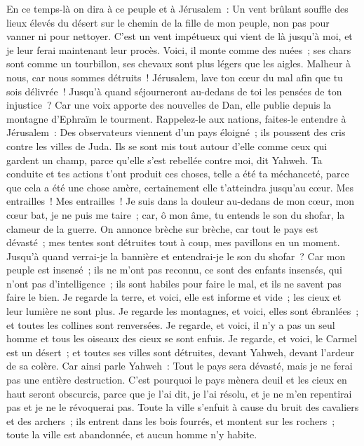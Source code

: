 \begin{multicols}{2}
En ce temps-là on dira à ce peuple et à Jérusalem~: Un vent brûlant souffle des lieux élevés du désert sur le chemin de la fille de mon peuple, non pas pour vanner ni pour nettoyer.
C'est un vent impétueux qui vient de là jusqu'à moi, et je leur ferai maintenant leur procès. 
Voici, il monte comme des nuées~; ses chars sont comme un tourbillon, ses chevaux sont plus légers que les aigles. Malheur à nous, car nous sommes détruits~!
Jérusalem, lave ton cœur du mal afin que tu sois délivrée~! Jusqu'à quand séjourneront au-dedans de toi les pensées de ton injustice~?
Car une voix apporte des nouvelles de Dan, elle publie depuis la montagne d'Ephraïm le tourment.
Rappelez-le aux nations, faites-le entendre à Jérusalem~: Des observateurs viennent d'un pays éloigné~; ils poussent des cris contre les villes de Juda.
Ils se sont mis tout autour d'elle comme ceux qui gardent un champ, parce qu'elle s'est rebellée contre moi, dit Yahweh.
Ta conduite et tes actions t'ont produit ces choses, telle a été ta méchanceté, parce que cela a été une chose amère, certainement elle t'atteindra jusqu'au cœur.
Mes entrailles~! Mes entrailles~! Je suis dans la douleur au-dedans de mon cœur, mon cœur bat, je ne puis me taire~; car, ô mon âme, tu entends le son du shofar, la clameur de la guerre.
On annonce brèche sur brèche, car tout le pays est dévasté~; mes tentes sont détruites tout à coup, mes pavillons en un moment.
Jusqu'à quand verrai-je la bannière et entendrai-je le son du shofar~?
Car mon peuple est insensé~; ils ne m'ont pas reconnu, ce sont des enfants insensés, qui n'ont pas d'intelligence~; ils sont habiles pour faire le mal, et ils ne savent pas faire le bien.
Je regarde la terre, et voici, elle est informe et vide~; les cieux et leur lumière ne sont plus.
Je regarde les montagnes, et voici, elles sont ébranlées~; et toutes les collines sont renversées.
Je regarde, et voici, il n'y a pas un seul homme et tous les oiseaux des cieux se sont enfuis.
Je regarde, et voici, le Carmel est un désert~; et toutes ses villes sont détruites, devant Yahweh, devant l'ardeur de sa colère.
Car ainsi parle Yahweh~: Tout le pays sera dévasté, mais je ne ferai pas une entière destruction.
C'est pourquoi le pays mènera deuil et les cieux en haut seront obscurcis, parce que je l'ai dit, je l'ai résolu, et je ne m'en repentirai pas et je ne le révoquerai pas.
Toute la ville s'enfuit à cause du bruit des cavaliers et des archers~; ils entrent dans les bois fourrés, et montent sur les rochers~; toute la ville est abandonnée, et aucun homme n'y habite.

\end{multicols}
